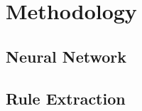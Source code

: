 \section{Methodology}
\label{sec:method}

\subsection{Neural Network}
\label{sec:nn}


\subsection{Rule Extraction}
\label{sec:re}

